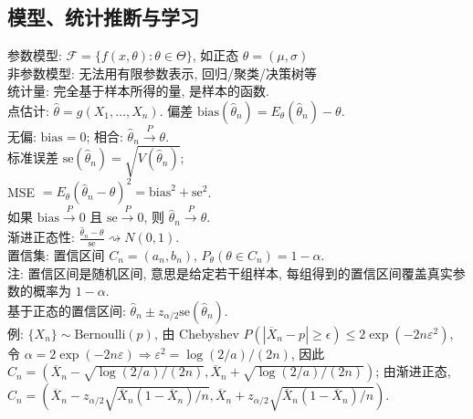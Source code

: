 \documentclass[a4paper, landscape,10pt]{article}
\begin{document}
\begin{multicols}{4}
\section{模型、统计推断与学习}
参数模型: $\mathcal{F}=\{f(x, \theta) : \theta \in \Theta\}$, 如正态 $\theta = (\mu, \sigma)$\\
非参数模型: 无法用有限参数表示, 回归/聚类/决策树等\\
统计量: 完全基于样本所得的量, 是样本的函数. \\
点估计: $\hat \theta = g(X_1, \dots, X_n)$. 
偏差 $\mathrm{bias}(\hat \theta_n) = E_\theta(\hat \theta_n) - \theta$. \\
无偏: $\mathrm{bias} = 0$; 相合: $\hat \theta_n \xrightarrow{P} \theta$. \\
标准误差 $\mathrm{se}(\hat \theta_n) = \sqrt{V(\hat \theta_n)}$; \\
MSE $ = E_\theta(\hat \theta_n - \theta)^2 = \mathrm{bias}^2 + \mathrm{se}^2$. \\
如果 $\mathrm{bias}\xrightarrow{P} 0$ 且 $\mathrm{se}\xrightarrow{P} 0$, 则 $\hat \theta_n \xrightarrow{P} \theta$. \\	
渐进正态性: $\frac{\hat\theta_n - \theta}{\mathrm{se}} \rightsquigarrow N(0, 1).$ \\
置信集: 置信区间 $C_n = (a_n, b_n)$, $P_\theta(\theta \in C_n) = 1 - \alpha$. \\
注: 置信区间是随机区间, 意思是给定若干组样本, 每组得到的置信区间覆盖真实参数的概率为 $1 - \alpha$. \\
基于正态的置信区间: $\hat \theta_n \pm z_{\alpha/2} \mathrm{se}(\hat \theta_n)$. \\
例: $\{X_n\} \sim \mathrm{Bernoulli}(p)$, 
由 Chebyshev $P(|\overline X_n - p| \geq \epsilon) \leq 2 \exp(-2n\varepsilon^2)$, 令 $\alpha= 2\exp(-2n\varepsilon) \Rightarrow \varepsilon ^ 2 = \log(2/a)/(2n)$, 因此 $C_n = (\overline X_n - \sqrt{\log(2/a)/(2n)}, \overline X_n + \sqrt{\log(2/a)/(2n)})$;
由渐进正态, $C_n =(\overline X_n - z_{\alpha/2} \sqrt{\overline X_n(1 - \overline X_n)/n}, \overline X_n + z_{\alpha/2} \sqrt{\overline X_n(1 - \overline X_n)/n})$. \\

\end{multicols}
\newpage
\end{document}
